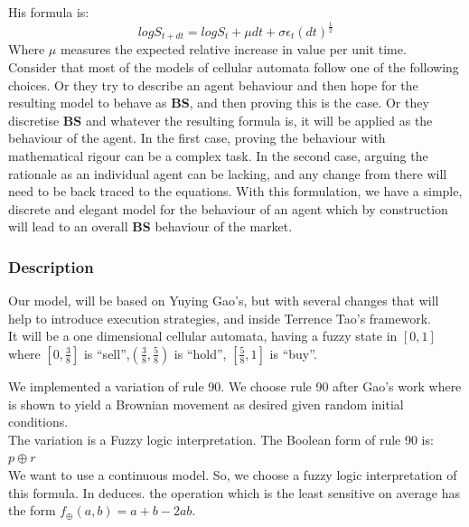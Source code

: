 \documentclass[twoside]{article}
\begin{document}
\begin{multicols}{2}
His formula is:
\begin{equation}
\label{eq:tt}
log S_{t+dt}=log S_t + \mu dt + \sigma \epsilon_t(dt)^{\frac{1}{2}}
\end{equation}
Where $\mu$ measures the expected relative increase in value per unit time.\\

Consider that most of the models of cellular automata follow one of the following choices. Or they try to describe an agent behaviour and then hope for the resulting model to behave as {\bf BS}, and then proving this is the case. Or they discretise {\bf BS} and whatever the resulting formula is, it will be applied as the behaviour of the agent. In the first case, proving the behaviour with mathematical rigour can be a complex task. In the second case, arguing the rationale as an individual agent can be lacking, and any change from there will need to be back traced to the equations. With this formulation, we have a simple, discrete and elegant model for the behaviour of an agent which by construction will lead to an overall {\bf BS} behaviour of the market.\\

\subsubsection{Description}

Our model, will be based on Yuying Gao's, but with several changes that will help to introduce execution strategies, and inside Terrence Tao's framework.\\

It will be a one dimensional cellular automata, having a fuzzy state in $[0,1]$ where $[0,\frac{3}{8}]$ is ``sell'',$(\frac{3}{8},\frac{5}{8})$ is ``hold'',  $[\frac{5}{8},1]$ is ``buy''.

We implemented a variation of rule 90. We choose rule 90 after Gao's work where is shown to yield a Brownian movement as desired given random initial conditions.\\

The variation is a Fuzzy logic interpretation.
The Boolean form of rule 90 is: $p \oplus r $\\

We want to use a continuous model. So, we choose a fuzzy logic interpretation of this formula. In \cite{Hernandez2011} deduces. the operation which is the least sensitive on average has the form $f_{\oplus}(a,b)=a+b-2ab$.\\


\end{multicols}
\end{document}
